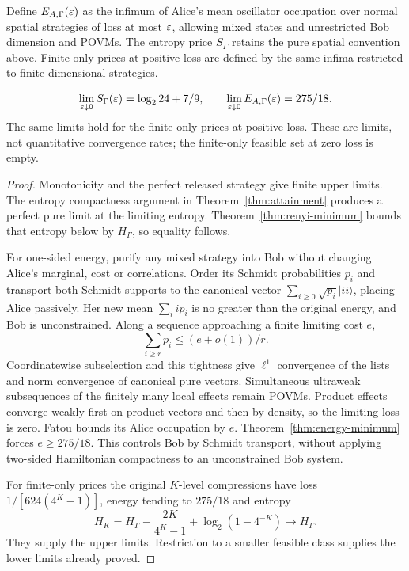 Define $E_{A,\Gamma}(\varepsilon)$ as the infimum of Alice's mean oscillator occupation over normal spatial strategies of loss at most $\varepsilon$, allowing mixed states and unrestricted Bob dimension and POVMs. The entropy price $S_\Gamma$ retains the pure spatial convention above. Finite-only prices at positive loss are defined by the same infima restricted to finite-dimensional strategies.

\begin{samepage}
\begin{theorem}\label{thm:price-limits}
\[
 \lim_{\varepsilon\downarrow0}S_\Gamma(\varepsilon)=\log_2 24+7/9,
 \qquad \lim_{\varepsilon\downarrow0}E_{A,\Gamma}(\varepsilon)=275/18.
\]
The same limits hold for the finite-only prices at positive loss. These are limits, not quantitative convergence rates; the finite-only feasible set at zero loss is empty.
\end{theorem}
\end{samepage}
\begin{proof}
Monotonicity and the perfect released strategy give finite upper limits. The entropy compactness argument in Theorem~\ref{thm:attainment} produces a perfect pure limit at the limiting entropy. Theorem~\ref{thm:renyi-minimum} bounds that entropy below by $H_\Gamma$, so equality follows.

For one-sided energy, purify any mixed strategy into Bob without changing Alice's marginal, cost or correlations. Order its Schmidt probabilities $p_i$ and transport both Schmidt supports to the canonical vector $\sum_{i\ge0}\sqrt{p_i}|ii\rangle$, placing Alice passively. Her new mean $\sum_i i p_i$ is no greater than the original energy, and Bob is unconstrained. Along a sequence approaching a finite limiting cost $e$,
\[
 \sum_{i\ge r}p_i\le(e+o(1))/r.
\]
Coordinatewise subselection and this tightness give $\ell^1$ convergence of the lists and norm convergence of canonical pure vectors. Simultaneous ultraweak subsequences of the finitely many local effects remain POVMs. Product effects converge weakly first on product vectors and then by density, so the limiting loss is zero. Fatou bounds its Alice occupation by $e$. Theorem~\ref{thm:energy-minimum} forces $e\ge275/18$. This controls Bob by Schmidt transport, without applying two-sided Hamiltonian compactness to an unconstrained Bob system.

For finite-only prices the original $K$-level compressions have loss $1/[624(4^K-1)]$, energy tending to $275/18$ and entropy
\[
 H_K=H_\Gamma-\frac{2K}{4^K-1}+\log_2(1-4^{-K})\longrightarrow H_\Gamma.
\]
They supply the upper limits. Restriction to a smaller feasible class supplies the lower limits already proved.
\end{proof}
